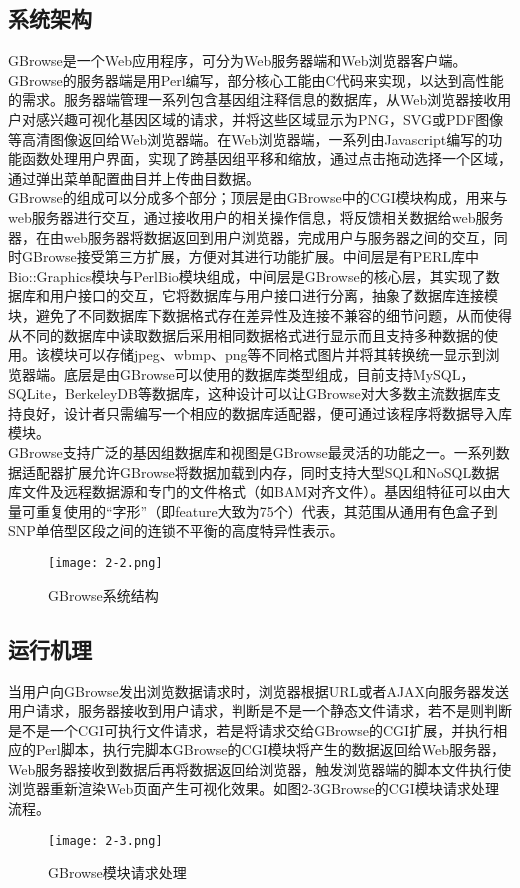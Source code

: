 		\subsection{系统架构}
		GBrowse是一个Web应用程序，可分为Web服务器端和Web浏览器客户端。GBrowse的服务器端是用Perl编写，部分核心工能由C代码来实现，以达到高性能的需求。服务器端管理一系列包含基因组注释信息的数据库，从Web浏览器接收用户对感兴趣可视化基因区域的请求，并将这些区域显示为PNG，SVG或PDF图像等高清图像返回给Web浏览器端。在Web浏览器端，一系列由Javascript编写的功能函数处理用户界面，实现了跨基因组平移和缩放，通过点击拖动选择一个区域，通过弹出菜单配置曲目并上传曲目数据。\\
		\indent GBrowse的组成可以分成多个部分；顶层是由GBrowse中的CGI模块构成，用来与web服务器进行交互，通过接收用户的相关操作信息，将反馈相关数据给web服务器，在由web服务器将数据返回到用户浏览器，完成用户与服务器之间的交互，同时GBrowse接受第三方扩展，方便对其进行功能扩展。中间层是有PERL库中Bio::Graphics模块与PerlBio模块组成，中间层是GBrowse的核心层，其实现了数据库和用户接口的交互，它将数据库与用户接口进行分离，抽象了数据库连接模块，避免了不同数据库下数据格式存在差异性及连接不兼容的细节问题，从而使得从不同的数据库中读取数据后采用相同数据格式进行显示而且支持多种数据的使用。该模块可以存储jpeg、wbmp、png等不同格式图片并将其转换统一显示到浏览器端。底层是由GBrowse可以使用的数据库类型组成，目前支持MySQL，SQLite，BerkeleyDB等数据库，这种设计可以让GBrowse对大多数主流数据库支持良好，设计者只需编写一个相应的数据库适配器，便可通过该程序将数据导入库模块。\\
		\indent GBrowse支持广泛的基因组数据库和视图是GBrowse最灵活的功能之一。一系列数据适配器扩展允许GBrowse将数据加载到内存，同时支持大型SQL和NoSQL数据库文件及远程数据源和专门的文件格式（如BAM对齐文件）。基因组特征可以由大量可重复使用的“字形”（即feature大致为75个）代表，其范围从通用有色盒子到SNP单倍型区段之间的连锁不平衡的高度特异性表示。
		\begin{figure}[!ht]
			\centering
			\texttt{[image: 2-2.png]}
			\caption{GBrowse系统结构}
		\end{figure}
		\subsection{运行机理}
		当用户向GBrowse发出浏览数据请求时，浏览器根据URL或者AJAX向服务器发送用户请求，服务器接收到用户请求，判断是不是一个静态文件请求，若不是则判断是不是一个CGI可执行文件请求，若是将请求交给GBrowse的CGI扩展，并执行相应的Perl脚本，执行完脚本GBrowse的CGI模块将产生的数据返回给Web服务器，Web服务器接收到数据后再将数据返回给浏览器，触发浏览器端的脚本文件执行使浏览器重新渲染Web页面产生可视化效果。如图2-3GBrowse的CGI模块请求处理流程。
			\begin{figure}[!ht]
				\centering
				\texttt{[image: 2-3.png]}
				\caption{GBrowse模块请求处理}
			\end{figure}
